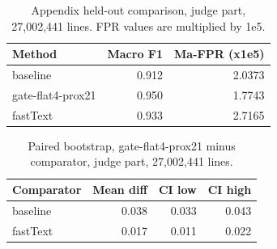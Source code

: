 \begin{table}[htbp]
\centering
\small
\begin{tabular}{lrr}
\toprule
\textbf{Method} & \textbf{Macro F1} & \textbf{Ma-FPR (x1e5)} \\
\midrule
baseline & 0.912 & 2.0373 \\
gate-flat4-prox21 & 0.950 & 1.7743 \\
fastText & 0.933 & 2.7165 \\
\bottomrule
\end{tabular}
\caption{Appendix held-out comparison, judge part, 27,002,441 lines. FPR values are multiplied by 1e5.}
\label{tab:paper_eval_appendix}
\end{table}

\begin{table}[htbp]
\centering
\small
\begin{tabular}{lrrr}
\toprule
\textbf{Comparator} & \textbf{Mean diff} & \textbf{CI low} & \textbf{CI high} \\
\midrule
baseline & 0.038 & 0.033 & 0.043 \\
fastText & 0.017 & 0.011 & 0.022 \\
\bottomrule
\end{tabular}
\caption{Paired bootstrap, gate-flat4-prox21 minus comparator, judge part, 27,002,441 lines.}
\label{tab:paper_eval_bootstrap}
\end{table}

